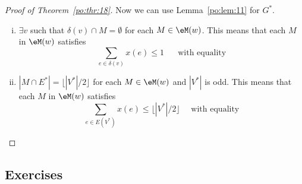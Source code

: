 \begin{proof}[Proof of Theorem~\ref{po:thr:18}]
      Now we can use Lemma~\ref{po:lem:11} for $G^*$. 
      
      \begin{enumerate}[i)]
      \item $\exists v$ such that $\delta(v) \cap M = \emptyset$ for each $M \in
        \eM(w)$. This means that each $M$ in $\eM(w)$ satisfies
        \begin{displaymath}
          \sum_{e \in          \delta(v)} x(e)\leq1 \quad \text{ {with equality}}
         \end{displaymath}
      \item $|M\cap E^*| =   \lfloor|V^*| /2\rfloor$ for each $M \in \eM(w)$ and $|V^*|$
        is odd. This means that each $M$ in $\eM(w)$ satisfies
        \begin{displaymath}
           \sum_{e \in E(V^*)          } x(e)\leq \lfloor|V^*|/2\rfloor \quad \text{
             {with equality}} 
        \end{displaymath}
      \end{enumerate}

    \end{proof}


\subsection*{Exercises}

